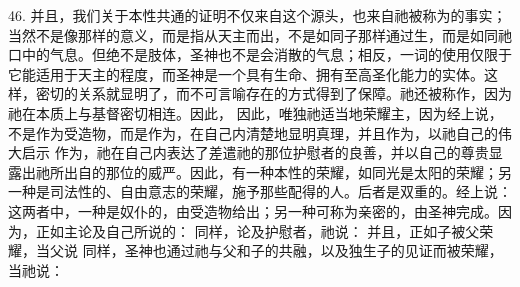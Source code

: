 46. 并且，我们关于本性共通的证明不仅来自这个源头，也来自祂被称为\newline{}的事实；当然不是像那样的意义，而是指从天主而出，不是如同子那样通过生，而是如同祂口中的气息。但绝不是肢体，圣神也不是会消散的气息；相反，一词的使用仅限于它能适用于天主的程度，而圣神是一个具有生命、拥有至高圣化能力的实体。这样，密切的关系就显明了，而不可言喻存在的方式得到了保障。祂还被称作，因为祂在本质上与基督密切相连。因此，\newline{} 因此，唯独祂适当地荣耀主，因为经上说，\newline{}不是作为受造物，而是作为\newline{}，在自己内清楚地显明真理，并且作为，以祂自己的伟大启示\newline{} 作为，祂在自己内表达了差遣祂的那位护慰者的良善，并以自己的尊贵显露出祂所出自的那位的威严。因此，有一种本性的荣耀，如同光是太阳的荣耀；另一种是司法性的、自由意志的荣耀，施予那些配得的人。后者是双重的。经上说：\newline{} 这两者中，一种是奴仆的，由受造物给出；另一种可称为亲密的，由圣神完成。因为，正如主论及自己所说的：\newline{} 同样，论及护慰者，祂说：\newline{} 并且，正如子被父荣耀，当父说\newline{} 同样，圣神也通过祂与父和子的共融，以及独生子的见证而被荣耀，当祂说：\newline{}\par

